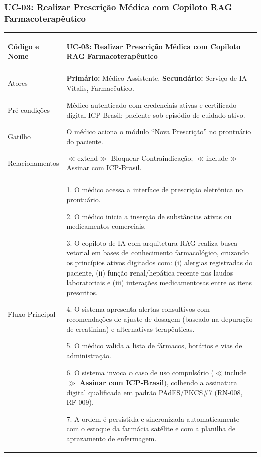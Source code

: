 \subsubsection{UC-03: Realizar Prescrição Médica com Copiloto RAG Farmacoterapêutico}
\label{sec:uc03}

\begingroup
\small
\begin{tabularx}{\textwidth}{>{\bfseries\raggedright\arraybackslash}p{3.4cm} X}
\toprule
Código e Nome & UC-03: Realizar Prescrição Médica com Copiloto RAG Farmacoterapêutico \\
\midrule
Atores & \textbf{Primário:} Médico Assistente. \textbf{Secundário:} Serviço de IA Vitalis, Farmacêutico. \\
Pré-condições & Médico autenticado com credenciais ativas e certificado digital ICP-Brasil; paciente sob episódio de cuidado ativo. \\
Gatilho & O médico aciona o módulo ``Nova Prescrição'' no prontuário do paciente. \\
Relacionamentos & $\ll$extend$\gg$ Bloquear Contraindicação; $\ll$include$\gg$ Assinar com ICP-Brasil. \\
\midrule
Fluxo Principal & 
1. O médico acessa a interface de prescrição eletrônica no prontuário.\par
2. O médico inicia a inserção de substâncias ativas ou medicamentos comerciais.\par
3. O copiloto de IA com arquitetura RAG realiza busca vetorial em bases de conhecimento farmacológico, cruzando os princípios ativos digitados com: (i) alergias registradas do paciente, (ii) função renal/hepática recente nos laudos laboratoriais e (iii) interações medicamentosas entre os itens prescritos.\par
4. O sistema apresenta alertas consultivos com recomendações de ajuste de dosagem (baseado na depuração de creatinina) e alternativas terapêuticas.\par
5. O médico valida a lista de fármacos, horários e vias de administração.\par
6. O sistema invoca o caso de uso compulsório ($\ll$include$\gg$ \textbf{Assinar com ICP-Brasil}), colhendo a assinatura digital qualificada em padrão PAdES/PKCS\#7 (RN-008, RF-009).\par
7. A ordem é persistida e sincronizada automaticamente com o estoque da farmácia satélite e com a planilha de aprazamento de enfermagem. \\

\end{tabularx}

